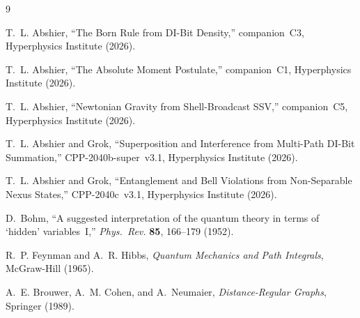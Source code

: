 \documentclass[11pt,a4paper]{article}
\begin{document}

\begin{thebibliography}{9}

T.~L. Abshier, ``The Born Rule from DI-Bit Density,''
companion~C3, Hyperphysics Institute (2026).

T.~L. Abshier, ``The Absolute Moment Postulate,''
companion~C1, Hyperphysics Institute (2026).

T.~L. Abshier, ``Newtonian Gravity from Shell-Broadcast SSV,''
companion~C5, Hyperphysics Institute (2026).

T.~L. Abshier and Grok,
``Superposition and Interference from Multi-Path DI-Bit Summation,''
CPP-2040b-super~v3.1, Hyperphysics Institute (2026).

T.~L. Abshier and Grok,
``Entanglement and Bell Violations from Non-Separable Nexus States,''
CPP-2040c~v3.1, Hyperphysics Institute (2026).

D.~Bohm, ``A suggested interpretation of the quantum theory in terms
of `hidden' variables~I,''
\textit{Phys.\ Rev.} \textbf{85}, 166--179 (1952).

R.~P. Feynman and A.~R. Hibbs,
\textit{Quantum Mechanics and Path Integrals}, McGraw-Hill (1965).

A.~E. Brouwer, A.~M. Cohen, and A.~Neumaier,
\textit{Distance-Regular Graphs}, Springer (1989).

\end{thebibliography}
\end{document}
